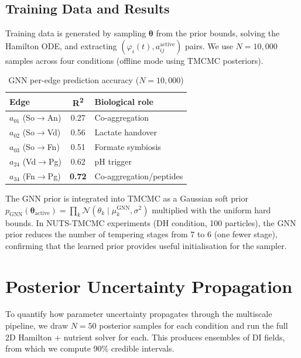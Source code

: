 \documentclass[11pt,a4paper]{article}
\begin{document}
\subsection{Training Data and Results}

Training data is generated by sampling $\boldsymbol{\theta}$ from the prior bounds, solving the Hamilton ODE, and extracting $({\varphi}_i(t), a_{ij}^\mathrm{active})$ pairs. We use $N=10{,}000$ samples across four conditions (offline mode using TMCMC posteriors).

\begin{table}[H]
\centering
\caption{GNN per-edge prediction accuracy ($N=10{,}000$)}
\label{tab:gnn_results}
\begin{tabular}{lcl}
\toprule
\textbf{Edge} & \textbf{R\textsuperscript{2}} & \textbf{Biological role} \\
\midrule
$a_{01}$ (So$\to$An) & 0.27 & Co-aggregation \\
$a_{02}$ (So$\to$Vd) & 0.56 & Lactate handover \\
$a_{03}$ (So$\to$Fn) & 0.51 & Formate symbiosis \\
$a_{24}$ (Vd$\to$Pg) & 0.62 & pH trigger \\
$a_{34}$ (Fn$\to$Pg) & \textbf{0.72} & Co-aggregation/peptides \\
\bottomrule
\end{tabular}
\end{table}

\noindent The GNN prior is integrated into TMCMC as a Gaussian soft prior $p_\mathrm{GNN}(\boldsymbol{\theta}_\mathrm{active}) = \prod_k \mathcal{N}(\theta_k \mid \mu_k^\mathrm{GNN}, \sigma^2)$ multiplied with the uniform hard bounds. In NUTS-TMCMC experiments (DH condition, 100 particles), the GNN prior reduces the number of tempering stages from 7 to 6 (one fewer stage), confirming that the learned prior provides useful initialisation for the sampler.

\section{Posterior Uncertainty Propagation}
\label{sec:uncertainty}

To quantify how parameter uncertainty propagates through the multiscale pipeline, we draw $N=50$ posterior samples for each condition and run the full 2D Hamilton + nutrient solver for each.
This produces ensembles of DI fields, from which we compute 90\% credible intervals.
\end{document}
